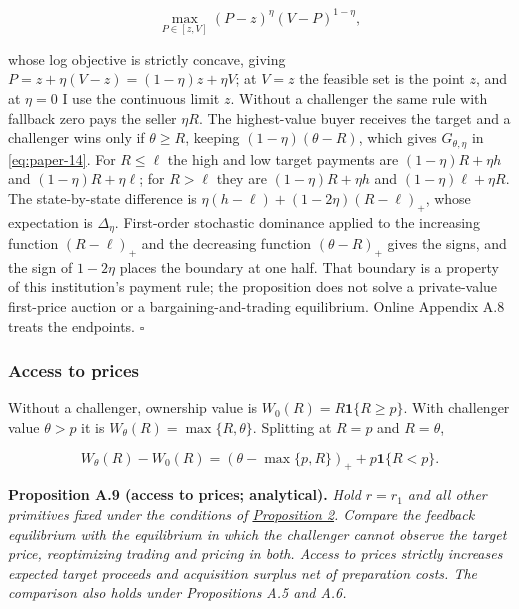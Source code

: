 \documentclass[
  12pt,
]{article}
\begin{document}
\[
\max_{P\in[z,V]}(P-z)^\eta(V-P)^{1-\eta},
\tag{A.38}\label{eq:paper-a-38}
\]

whose log objective is strictly concave, giving
\(P=z+\eta(V-z)=(1-\eta)z+\eta V\); at \(V=z\) the feasible set is the
point \(z\), and at \(\eta=0\) I use the continuous limit \(z\). Without
a challenger the same rule with fallback zero pays the seller
\(\eta R\). The highest-value buyer receives the target and a challenger
wins only if \(\theta\ge R\), keeping \((1-\eta)(\theta-R)\), which
gives \(G_{\theta,\eta}\) in \eqref{eq:paper-14}. For \(R\le\ell\) the
high and low target payments are \((1-\eta)R+\eta h\) and
\((1-\eta)R+\eta\ell\); for \(R>\ell\) they are \((1-\eta)R+\eta h\) and
\((1-\eta)\ell+\eta R\). The state-by-state difference is
\(\eta(h-\ell)+(1-2\eta)(R-\ell)_+\), whose expectation is
\(\Delta_\eta\). First-order stochastic dominance applied to the
increasing function \((R-\ell)_+\) and the decreasing function
\((\theta-R)_+\) gives the signs, and the sign of \(1-2\eta\) places the
boundary at one half. That boundary is a property of this institution's
payment rule; the proposition does not solve a private-value first-price
auction or a bargaining-and-trading equilibrium. Online Appendix A.8
treats the endpoints. \(\square\)

\subsubsection{Access to prices}\label{access-to-prices}

Without a challenger, ownership value is \(W_0(R)=R\mathbf1\{R\ge p\}\).
With challenger value \(\theta>p\) it is
\(W_\theta(R)=\max\{R,\theta\}\). Splitting at \(R=p\) and \(R=\theta\),

\[
W_\theta(R)-W_0(R)
=(\theta-\max\{p,R\})_++p\mathbf1\{R<p\}.
\tag{A.39}\label{eq:paper-a-39}
\]


\protect{}\label{result-proposition-a-9}{\textbf{Proposition
A.9 (access to prices; analytical).}} \emph{Hold \(r=r_1\) and all other
primitives fixed under the conditions of
\hyperref[result-proposition-2]{Proposition 2}. Compare the feedback
equilibrium with the equilibrium in which the challenger cannot observe
the target price, reoptimizing trading and pricing in both. Access to
prices strictly increases expected target proceeds and acquisition
surplus net of preparation costs. The comparison also holds under
Propositions A.5 and A.6.}
\end{document}
